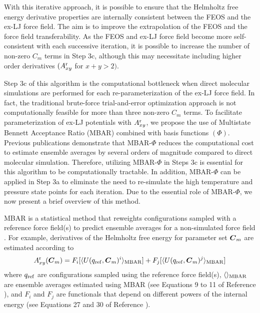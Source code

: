 \documentclass[11pt,a4paper]{article}
\newcommand{\bfv}[1]{{\mbox{\boldmath{$#1$}}}}
\newcommand{\C}{\bfv{C}}
\begin{document}
With this iterative approach, it is possible to ensure that the Helmholtz free energy derivative properties are internally consistent between the FEOS and the ex-LJ force field. The aim is to improve the extrapolation of the FEOS and the force field transferability. As the FEOS and ex-LJ force field become more self-consistent with each successive iteration, it is possible to increase the number of non-zero $C_m$ terms in Step 3c, although this may necessitate including higher order derivatives $(A_{xy}^{\rm r}$ for $x+y>2)$.


Step 3c of this algorithm is the computational bottleneck when direct molecular simulations are performed for each re-parameterization of the ex-LJ force field. In fact, the traditional brute-force trial-and-error optimization approach is not computationally feasible for more than three non-zero $C_m$ terms. To facilitate parameterization of ex-LJ potentials with $A_{xy}^{\rm r}$, we propose the use of Multistate Bennett Acceptance Ratio (MBAR) combined with basis functions $(\Phi)$. Previous publications demonstrate that MBAR-$\Phi$ reduces the computational cost to estimate ensemble averages by several orders of magnitude compared to direct molecular simulation. Therefore, utilizing MBAR-$\Phi$ in Steps 3c is essential for this algorithm to be computationally tractable. In addition, MBAR-$\Phi$ can be applied in Step 3a to eliminate the need to re-simulate the high temperature and pressure state points for each iteration. Due to the essential role of MBAR-$\Phi$, we now present a brief overview of this method. 


MBAR is a statistical method that reweights configurations sampled with a reference force field(s) to predict ensemble averages for a non-simulated force field \cite{shirts-chodera:jcp:2008:mbar,Messerly2018_1}. For example, derivatives of the Helmholtz free energy for parameter set $\C_m$ are estimated according to 
\begin{equation}
A_{xy}^{\rm r}(\C_m) = F_i[\langle U(q_{\rm ref},\C_m)^i \rangle_{\rm MBAR}] + F_j[\langle U(q_{\rm ref},\C_m)^j \rangle_{\rm MBAR}]
\end{equation}
where $q_{\rm ref}$ are configurations sampled using the reference force field(s), $\langle\rangle_{\rm MBAR}$ are ensemble averages estimated using MBAR (see Equations 9 to 11 of Reference ), and $F_i$ and $F_j$ are functionals that depend on different powers of the internal energy (see Equations 27 and 30 of Reference ). 
\end{document}
